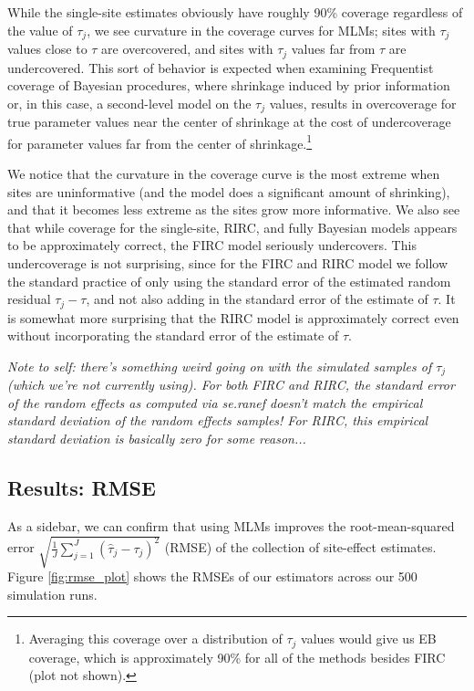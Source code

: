 \documentclass[]{article}
\begin{document}
While the single-site estimates obviously have roughly 90\% coverage regardless of the value of $\tau_j$, we see curvature in the coverage curves for MLMs; sites with $\tau_j$ values close to $\tau$ are overcovered, and sites with $\tau_j$ values far from $\tau$ are undercovered.
This sort of behavior is expected when examining Frequentist coverage of Bayesian procedures, where shrinkage induced by prior information or, in this case, a second-level model on the $\tau_j$ values, results in overcoverage for true parameter values near the center of shrinkage at the cost of undercoverage for parameter values far from the center of shrinkage.\footnote{Averaging this coverage over a distribution of $\tau_j$ values would give us EB coverage, which is approximately 90\% for all of the methods besides FIRC (plot not shown).}

We notice that the curvature in the coverage curve is the most extreme when sites are uninformative (and the model does a significant amount of shrinking), and that it becomes less extreme as the sites grow more informative.
We also see that while coverage for the single-site, RIRC, and fully Bayesian models appears to be approximately correct, the FIRC model seriously undercovers.
This undercoverage is not surprising, since for the FIRC and RIRC model we follow the standard practice of only using the standard error of the estimated random residual $\tau_j - \tau$, and not also adding in the standard error of the estimate of $\tau$.
It is somewhat more surprising that the RIRC model is approximately correct even without incorporating the standard error of the estimate of $\tau$.

\textit{Note to self: there's something weird going on with the simulated samples of $\tau_j$ (which we're not currently using).
For both FIRC and RIRC, the standard error of the random effects as computed via se.ranef doesn't match the empirical standard deviation of the random effects samples!
For RIRC, this empirical standard deviation is basically zero for some reason...}


\subsection{Results: RMSE}

As a sidebar, we can confirm that using MLMs improves the root-mean-squared error $\sqrt{\frac{1}{J} \sum_{j=1}^J (\hat{\tau}_j - \tau_j)^2}$ (RMSE) of the collection of site-effect estimates.
Figure \ref{fig:rmse_plot} shows the RMSEs of our estimators across our 500 simulation runs.
\end{document}
